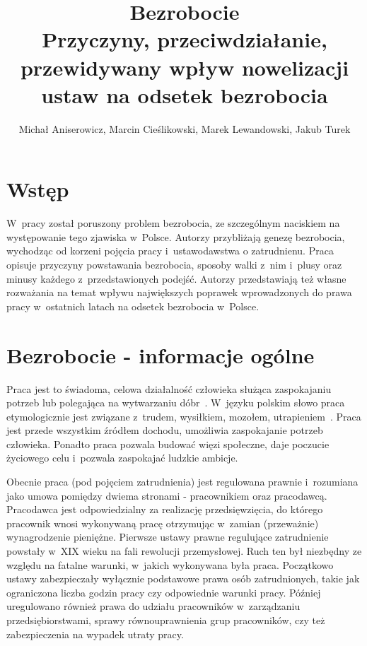 \documentclass[12pt]{article}
\title{Bezrobocie \\ \Large{Przyczyny, przeciwdziałanie, przewidywany wpływ nowelizacji ustaw na odsetek bezrobocia}}
\author{Michał Aniserowicz, Marcin Cieślikowski, Marek Lewandowski, Jakub Turek}
\date{}
\begin{document}
    \maketitle
    
    \section*{Wstęp}
    
    W~pracy został poruszony problem bezrobocia, ze szczególnym naciskiem na występowanie tego zjawiska w~Polsce. Autorzy przybliżają genezę bezrobocia, wychodząc od korzeni pojęcia pracy i~ustawodawstwa o zatrudnienu. Praca opisuje przyczyny powstawania bezrobocia, sposoby walki z~nim i~plusy oraz minusy każdego z~przedstawionych podejść. Autorzy przedstawiają też własne rozważania na temat wpływu największych poprawek wprowadzonych do prawa pracy w~ostatnich latach na odsetek bezrobocia w~Polsce.
    
    \section*{Bezrobocie - informacje ogólne}
    
    Praca jest to świadoma, celowa działalność człowieka służąca zaspokajaniu potrzeb lub polegająca na wytwarzaniu dóbr~\cite{ort}. W~języku polskim słowo praca etymologicznie jest związane z~trudem, wysiłkiem, mozołem, utrapieniem~\cite{etym}. Praca jest przede wszystkim źródłem dochodu, umożliwia zaspokajanie potrzeb człowieka. Ponadto praca pozwala budować więzi społeczne, daje poczucie życiowego celu i~pozwala zaspokajać ludzkie ambicje. 
    
    Obecnie praca (pod pojęciem zatrudnienia) jest regulowana prawnie i~rozumiana jako umowa pomiędzy dwiema stronami - pracownikiem oraz pracodawcą. Pracodawca jest odpowiedzialny za realizację przedsięwzięcia, do którego pracownik wnosi wykonywaną pracę otrzymując w~zamian (przeważnie) wynagrodzenie pieniężne. Pierwsze ustawy prawne regulujące zatrudnienie powstały w~XIX wieku na fali rewolucji przemysłowej. Ruch ten był niezbędny ze względu na fatalne warunki, w~jakich wykonywana była praca. Początkowo ustawy zabezpieczały wyłącznie podstawowe prawa osób zatrudnionych, takie jak ograniczona liczba godzin pracy czy odpowiednie warunki pracy. Później uregulowano również prawa do udziału pracowników w~zarządzaniu przedsiębiorstwami, sprawy równouprawnienia grup pracowników, czy też zabezpieczenia na wypadek utraty pracy.
    
\end{document}
